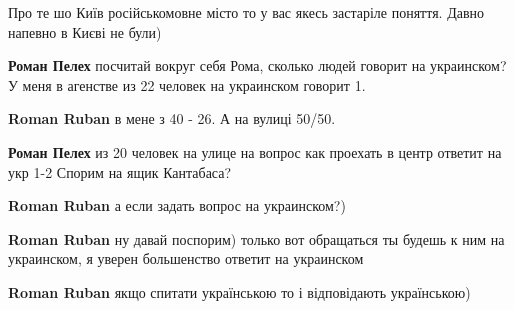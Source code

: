 \begin{itemize}
Про те шо Київ російськомовне місто то у вас якесь застаріле поняття. Давно
напевно в Києві не були)

\begin{itemize}
 
\textbf{Роман Пелех} посчитай вокруг себя Рома, сколько людей говорит на украинском?
У меня в агенстве из 22 человек на украинском говорит 1.

 

\textbf{Roman Ruban} в мене з 40 - 26. А на вулиці 50/50.

 
\textbf{Роман Пелех} из 20 человек на улице на вопрос как проехать в центр ответит на укр 1-2
Спорим на ящик Кантабаса?

 
\textbf{Roman Ruban} а если задать вопрос на украинском?)

 
\textbf{Roman Ruban} ну давай поспорим) только вот обращаться ты будешь к ним на украинском, я уверен большенство ответит на украинском

 

\textbf{Roman Ruban} якщо спитати українською то і відповідають українською)


\end{itemize}
\end{itemize}

